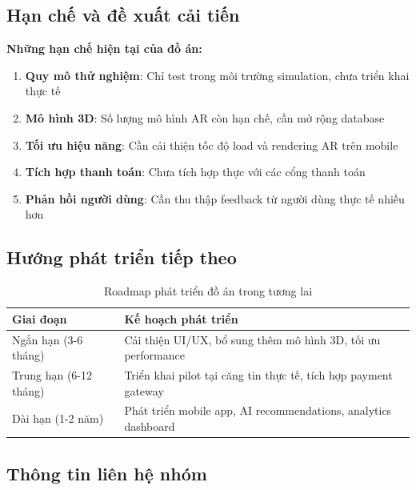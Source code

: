 \documentclass[12pt,a4paper]{article}
\begin{document}
\subsection{Hạn chế và đề xuất cải tiến}

\textbf{Những hạn chế hiện tại của đồ án:}

\begin{enumerate}
    \item \textbf{Quy mô thử nghiệm}: Chỉ test trong môi trường simulation, chưa triển khai thực tế
    \item \textbf{Mô hình 3D}: Số lượng mô hình AR còn hạn chế, cần mở rộng database
    \item \textbf{Tối ưu hiệu năng}: Cần cải thiện tốc độ load và rendering AR trên mobile
    \item \textbf{Tích hợp thanh toán}: Chưa tích hợp thực với các cổng thanh toán
    \item \textbf{Phản hồi người dùng}: Cần thu thập feedback từ người dùng thực tế nhiều hơn
\end{enumerate}

\subsection{Hướng phát triển tiếp theo}

\begin{table}[H]
\centering
\caption{Roadmap phát triển đồ án trong tương lai}
\label{tab:future-roadmap}
\begin{tabular}{@{}p{3.5cm}p{10.5cm}@{}}
\toprule
\textbf{Giai đoạn} & \textbf{Kế hoạch phát triển} \\
\midrule
Ngắn hạn (3-6 tháng) & Cải thiện UI/UX, bổ sung thêm mô hình 3D, tối ưu performance \\
Trung hạn (6-12 tháng) & Triển khai pilot tại căng tin thực tế, tích hợp payment gateway \\
Dài hạn (1-2 năm) & Phát triển mobile app, AI recommendations, analytics dashboard \\
\bottomrule
\end{tabular}
\end{table}

\subsection{Thông tin liên hệ nhóm}
\end{document}
